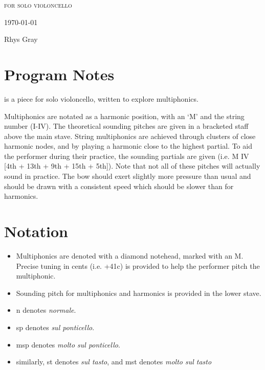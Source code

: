 
\invisiblechapter{\celloPiece}

\vspace{3.8cm}

\begin{center}

\textsc{for solo violoncello}

\vspace{2.8cm}

\HRule{0.5pt}

\LARGE \textbf{\uppercase{\celloPiece}}

\HRule{2pt}

\vspace{1.8cm}

\normalsize \today

\vspace{3.8cm}

Rhys Gray

\end{center}
\newpage

\section*{Program Notes}
\celloPiece is a piece for solo violoncello, written to explore multiphonics. 

Multiphonics are notated as a harmonic position, with an `M' and the string number (I-IV). 
The theoretical sounding pitches are given in a bracketed staff above the main stave.
String multiphonics are achieved through clusters of close harmonic nodes, and by playing a harmonic close to the highest partial.
To aid the performer during their practice, the sounding partials are given (i.e. M IV [4th + 13th + 9th + 15th + 5th]).
Note that not all of these pitches will actually sound in practice.
The bow should exert slightly more pressure than usual and should be drawn with a consistent speed which should be slower than for harmonics.

\section*{Notation}
\begin{itemize}

    \item Multiphonics are denoted with a diamond notehead, marked with an M. Precise tuning in cents (i.e. +41c) is provided to help the performer pitch the multiphonic.
    \item Sounding pitch for multiphonics and harmonics is provided in the lower stave.
    \item n denotes \emph{normale}.
    \item sp denotes \emph{sul ponticello}.
    \item msp denotes \emph{molto sul ponticello}.
    \item similarly, st denotes \emph{sul tasto}, and mst denotes \emph{molto sul tasto}
\end{itemize}

\newpage
\label{app:to/do Score}
